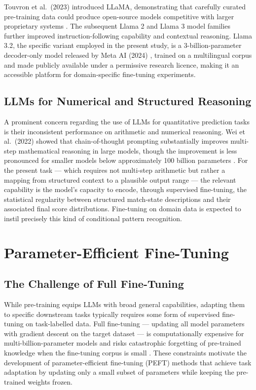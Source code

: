Touvron et al.\ (2023) introduced LLaMA, demonstrating that carefully curated pre-training data could produce open-source models competitive with larger proprietary systems \cite{touvron2023llama}. The subsequent Llama 2 and Llama 3 model families further improved instruction-following capability and contextual reasoning. Llama 3.2, the specific variant employed in the present study, is a 3-billion-parameter decoder-only model released by Meta AI (2024) \cite{meta2024llama3}, trained on a multilingual corpus and made publicly available under a permissive research licence, making it an accessible platform for domain-specific fine-tuning experiments.

\subsection{LLMs for Numerical and Structured Reasoning}

A prominent concern regarding the use of LLMs for quantitative prediction tasks is their inconsistent performance on arithmetic and numerical reasoning. Wei et al.\ (2022) showed that chain-of-thought prompting substantially improves multi-step mathematical reasoning in large models, though the improvement is less pronounced for smaller models below approximately 100 billion parameters \cite{wei2022chain}. For the present task --- which requires not multi-step arithmetic but rather a mapping from structured context to a plausible output range --- the relevant capability is the model's capacity to encode, through supervised fine-tuning, the statistical regularity between structured match-state descriptions and their associated final score distributions. Fine-tuning on domain data is expected to instil precisely this kind of conditional pattern recognition.

\section{Parameter-Efficient Fine-Tuning}

\subsection{The Challenge of Full Fine-Tuning}

While pre-training equips LLMs with broad general capabilities, adapting them to specific downstream tasks typically requires some form of supervised fine-tuning on task-labelled data. Full fine-tuning --- updating all model parameters with gradient descent on the target dataset --- is computationally expensive for multi-billion-parameter models and risks catastrophic forgetting of pre-trained knowledge when the fine-tuning corpus is small \cite{kirkpatrick2017overcoming}. These constraints motivate the development of parameter-efficient fine-tuning (PEFT) methods that achieve task adaptation by updating only a small subset of parameters while keeping the pre-trained weights frozen.

